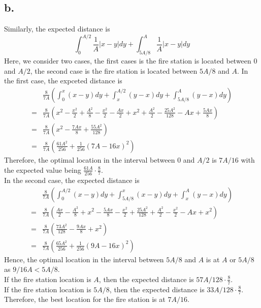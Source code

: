 \documentclass[11pt]{article}
\begin{document}
\subsection*{b.}
Similarly, the expected distance is 
\[ 
    \int_0^{A/2} \frac{1}{A} |x-y| dy + \int_{5A/8}^A \frac{1}{A} |x-y| dy 
\]
Here, we consider two cases, the first cases is the fire station is located between $0$ and $A/2$, 
the second case is the fire station is located between $5A/8$ and $A$. 
In the first case, the expceted distance is 
\begin{equation*}
    \begin{aligned}
        &\frac{8}{7A} \left( \int_0^x (x-y) dy + \int_x^{A/2} (y-x) dy + \int_{5A/8}^A (y-x) dy \right) \\
        =&\frac{8}{7A} \left( x^2-\frac{x^2}{2} + \frac{A^2}{8} - \frac{x^2}{2} - \frac{Ax}{2} + x^2 + \frac{A^2}{2} - \frac{25A^2}{128} -Ax +\frac{5Ax}{8}\right) \\
        =& \frac{8}{7A} \left( x^2 - \frac{7Ax}{8} + \frac{55A^2}{128} \right) \\   
        =& \frac{8}{7A} \left(\frac{61A^2}{256} + \frac{1}{256}(7 A - 16 x)^2 \right)
    \end{aligned}
\end{equation*}
Therefore, the optimal location in the interval between $0$ and $A/2$ is $7A/16$ with the expected value being $\frac{61A}{256} \cdot \frac{8}{7}$. \\
In the second case, the expected distance is
\begin{equation*}
    \begin{aligned}
        &\frac{8}{7A} \left( \int_0^{A/2} (x-y) dy + \int_{5A/8}^{x} (x-y) dy + \int_x^A (y-x) dy \right) \\
        =&\frac{8}{7A} \left(\frac{Ax}{2} - \frac{A^2}{8} + x^2 - \frac{5Ax}{8} -\frac{x^2}{2} + \frac{25A^2}{128} + \frac{A^2}{2} - \frac{x^2}{2} -Ax + x^2 \right) \\  
        =& \frac{8}{7A}\left( \frac{73 A^2}{128} - \frac{9A x}{8} + x^2 \right) \\
        =& \frac{8}{7A} \left(\frac{65A^2}{256}+ \frac{1}{256}(9A - 16x)^2 \right)
    \end{aligned}
\end{equation*}
Hence, the optimal location in the interval between $5A/8$ and $A$ is at $A$ or $5A/8$ as $9/16A < 5A/8$. \\
If the fire station location is $A$, then the expected distance is $57A/128 \cdot \frac{8}{7}$. \\
If the fire station location is $5A/8$, then the expected distance is $33A/128 \cdot \frac{8}{7}$. \\
Therefore, the best location for the fire station is at $7A/16$.
\end{document}
